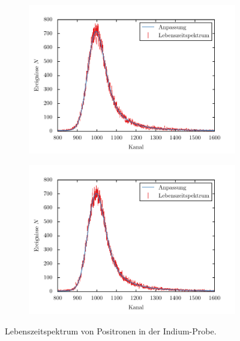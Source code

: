 \documentclass[11pt, a4paper]{article}
\numberwithin{equation}{section}
\begin{document}
\begin{appendix}
\begin{figure}
	\begin{subfigure}{\textwidth}
		\centering
		\includegraphics{./figures/lifetimes/99_grad.pdf}
	\end{subfigure}
	\begin{subfigure}{\textwidth}
		\centering
		\includegraphics{./figures/lifetimes/110_grad.pdf}
	\end{subfigure}
	\caption{Lebenszeitspektrum von Positronen in der Indium-Probe.}
\end{figure}


\end{appendix}
\end{document}
